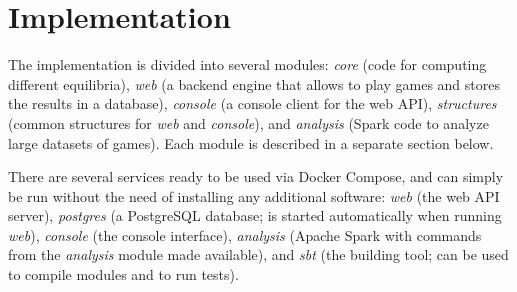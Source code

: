 \chapter{Implementation}
\label{chap:impl}
The implementation is divided into several modules: \textit{core} (code for computing different equilibria), \textit{web} (a backend engine that allows to play games and stores the results in a database), \textit{console} (a console client for the web API), \textit{structures} (common structures for \textit{web} and \textit{console}), and \textit{analysis} (Spark code to analyze large datasets of games).
Each module is described in a separate section below.

There are several services ready to be used via Docker Compose, and can simply be run without the need of installing any additional software:
\textit{web} (the web API server), \textit{postgres} (a PostgreSQL database; is started automatically when running \textit{web}), \textit{console} (the console interface), \textit{analysis} (Apache Spark with commands from the \textit{analysis} module made available), and \textit{sbt} (the building tool; can be used to compile modules and to run tests).

